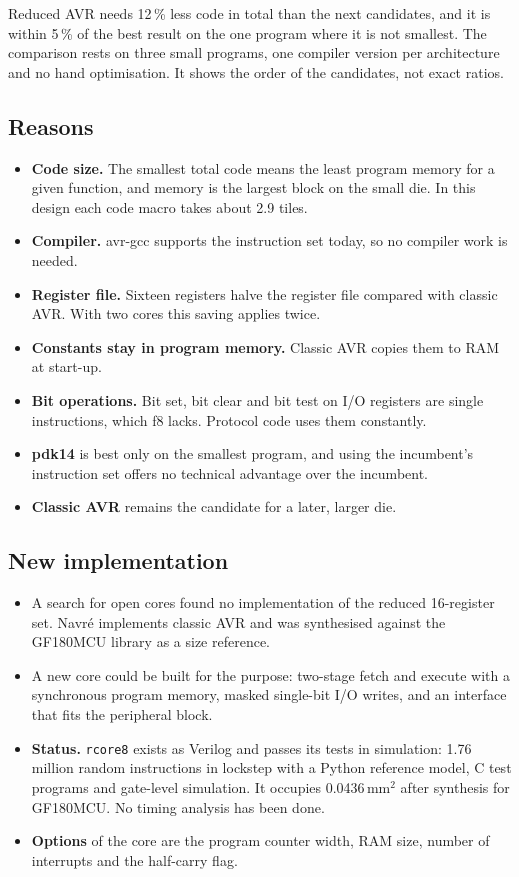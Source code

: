 \documentclass[10pt,a4paper]{article}
\begin{document}
Reduced AVR needs 12\,\% less code in total than the next candidates, and it is within 5\,\% of the best result
on the one program where it is not smallest. The comparison rests on three small programs, one compiler version
per architecture and no hand optimisation. It shows the order of the candidates, not exact ratios.

\subsection{Reasons}

\begin{itemize}
\item \textbf{Code size.} The smallest total code means the least program memory for a given function, and
memory is the largest block on the small die. In this design each code macro takes about 2.9 tiles.
\item \textbf{Compiler.} avr-gcc supports the instruction set today, so no compiler work is needed.
\item \textbf{Register file.} Sixteen registers halve the register file compared with classic AVR. With two cores this saving applies twice.
\item \textbf{Constants stay in program memory.} Classic AVR copies them to RAM at start-up.
\item \textbf{Bit operations.} Bit set, bit clear and bit test on I/O registers are single instructions, which
f8 lacks. Protocol code uses them constantly.
\item \textbf{pdk14} is best only on the smallest program, and using the incumbent's instruction set offers no
technical advantage over the incumbent.
\item \textbf{Classic AVR} remains the candidate for a later, larger die.
\end{itemize}

\subsection{New implementation}

\begin{itemize}
\item A search for open cores found no implementation of the reduced 16-register set. Navr\'e implements
classic AVR and was synthesised against the GF180MCU library as a size reference.
\item A new core could be built for the purpose: two-stage fetch and execute with a synchronous program memory,
masked single-bit I/O writes, and an interface that fits the peripheral block.
\item \textbf{Status.} \texttt{rcore8} exists as Verilog and passes its tests in simulation: 1.76 million random
instructions in lockstep with a Python reference model, C test programs and gate-level simulation. It occupies
0.0436\,mm$^2$ after synthesis for GF180MCU. No timing analysis has been done.
\item \textbf{Options} of the core are the program counter width, RAM size, number of interrupts and the
half-carry flag.
\end{itemize}
\end{document}
